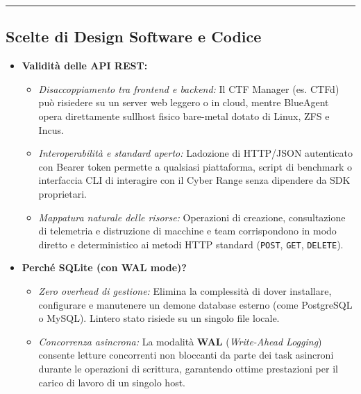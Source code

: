 \begin{center}\rule{0.5\linewidth}{0.5pt}\end{center}

\subsection{Scelte di Design Software e
Codice}\label{scelte-di-design-software-e-codice}

\begin{itemize}
\item
  \textbf{Validità delle API REST:}

  \begin{itemize}
  \tightlist
  \item
    \emph{Disaccoppiamento tra frontend e backend:} Il CTF Manager (es.
    CTFd) può risiedere su un server web leggero o in cloud, mentre
    BlueAgent opera direttamente sull\textquotesingle host fisico
    bare-metal dotato di Linux, ZFS e Incus.
  \item
    \emph{Interoperabilità e standard aperto:}
    L\textquotesingle adozione di HTTP/JSON autenticato con Bearer token
    permette a qualsiasi piattaforma, script di benchmark o interfaccia
    CLI di interagire con il Cyber Range senza dipendere da SDK
    proprietari.
  \item
    \emph{Mappatura naturale delle risorse:} Operazioni di creazione,
    consultazione di telemetria e distruzione di macchine e team
    corrispondono in modo diretto e deterministico ai metodi HTTP
    standard (\passthrough{\lstinline!POST!},
    \passthrough{\lstinline!GET!}, \passthrough{\lstinline!DELETE!}).
  \end{itemize}
\item
  \textbf{Perché SQLite (con WAL mode)?}

  \begin{itemize}
  \tightlist
  \item
    \emph{Zero overhead di gestione:} Elimina la complessità di dover
    installare, configurare e manutenere un demone database esterno
    (come PostgreSQL o MySQL). L\textquotesingle intero stato risiede su
    un singolo file locale.
  \item
    \emph{Concorrenza asincrona:} La modalità \textbf{WAL}
    (\emph{Write-Ahead Logging}) consente letture concorrenti non
    bloccanti da parte dei task asincroni durante le operazioni di
    scrittura, garantendo ottime prestazioni per il carico di lavoro di
    un singolo host.
  \end{itemize}
\end{itemize}

